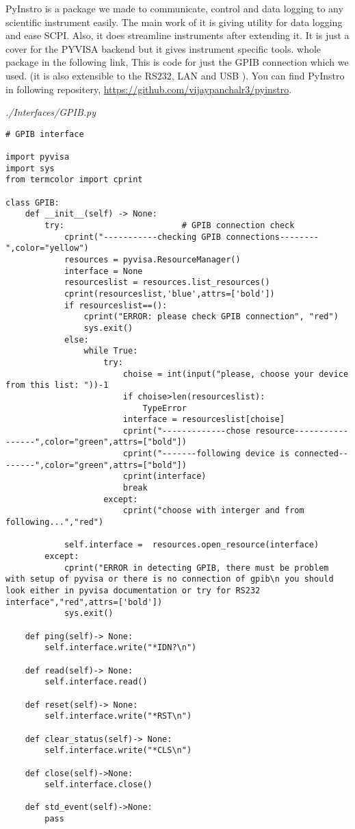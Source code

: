 
PyInstro is a package we made to communicate, control and data logging to any scientific instrument easily. The main work of it is giving utility for data logging and ease SCPI. Also, it does streamline instruments after extending it. It is just a cover for the PYVISA backend but it gives instrument specific tools. whole package in the following link,
This is code for just the GPIB connection which we used. (it is also extensible to the RS232, LAN and USB ). You can find PyInstro in following repositery, \href{https://github.com/vijaypanchalr3/pyinstro}{https://github.com/vijaypanchalr3/pyinstro}. 


\emph{./Interfaces/GPIB.py}

\begin{verbatim}
# GPIB interface

import pyvisa
import sys
from termcolor import cprint

class GPIB:
    def __init__(self) -> None:                                 
        try:                        # GPIB connection check
            cprint("-----------checking GPIB connections--------",color="yellow")
            resources = pyvisa.ResourceManager()
            interface = None
            resourceslist = resources.list_resources()
            cprint(resourceslist,'blue',attrs=['bold'])
            if resourceslist==():
                cprint("ERROR: please check GPIB connection", "red")
                sys.exit()
            else:
                while True:
                    try:
                        choise = int(input("please, choose your device from this list: "))-1
                        if choise>len(resourceslist):
                            TypeError
                        interface = resourceslist[choise]
                        cprint("-------------chose resource-----------------",color="green",attrs=["bold"])
                        cprint("-------following device is connected--------",color="green",attrs=["bold"])
                        cprint(interface)
                        break
                    except:
                        cprint("choose with interger and from following...","red")

            self.interface =  resources.open_resource(interface)
        except:
            cprint("ERROR in detecting GPIB, there must be problem with setup of pyvisa or there is no connection of gpib\n you should look either in pyvisa documentation or try for RS232 interface","red",attrs=['bold'])
            sys.exit()

    def ping(self)-> None:
        self.interface.write("*IDN?\n")

    def read(self)-> None:
        self.interface.read()

    def reset(self)-> None:
        self.interface.write("*RST\n")

    def clear_status(self)-> None:
        self.interface.write("*CLS\n")

    def close(self)->None:
        self.interface.close()

    def std_event(self)->None:
        pass


\end{verbatim}
